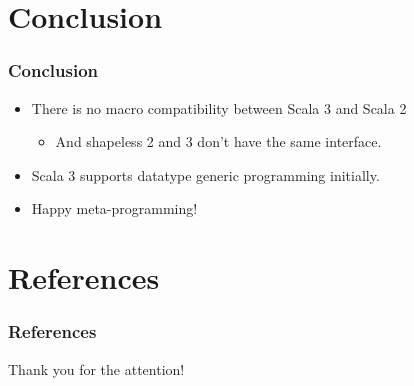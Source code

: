 


\section{Conclusion}

\begin{frame}
  \frametitle{Conclusion}

  \pause
  \begin{itemize}
    \item<+-> There is no macro compatibility between Scala 3 and Scala 2 
    \begin{itemize}
      \item And shapeless 2 and 3 don't have the same interface.
    \end{itemize}

    \item Scala 3 supports datatype generic programming initially.

    \item Happy meta-programming!
  \end{itemize}
\end{frame}

\section*{References}
\begin{frame}%
  \frametitle{References}
  
  
\end{frame}

\begin{frame}
  \centering
  {\Huge Thank you for the attention!}
\end{frame}


